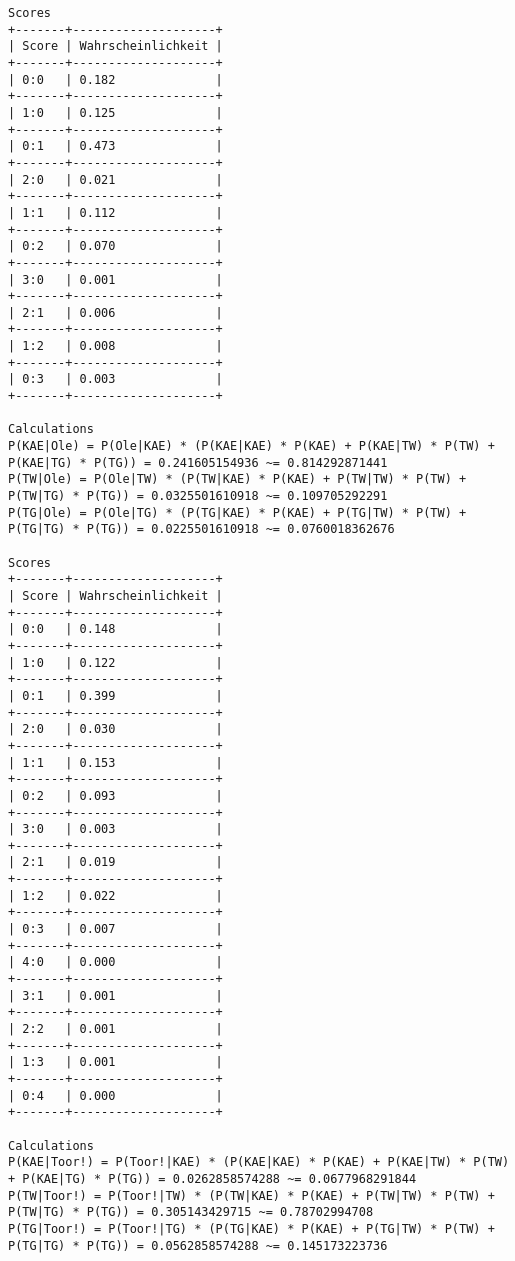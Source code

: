 \documentclass[a4paper]{article}
\begin{document}
\begin{lstlisting}
Scores
+-------+--------------------+
| Score | Wahrscheinlichkeit |
+-------+--------------------+
| 0:0   | 0.182              |
+-------+--------------------+
| 1:0   | 0.125              |
+-------+--------------------+
| 0:1   | 0.473              |
+-------+--------------------+
| 2:0   | 0.021              |
+-------+--------------------+
| 1:1   | 0.112              |
+-------+--------------------+
| 0:2   | 0.070              |
+-------+--------------------+
| 3:0   | 0.001              |
+-------+--------------------+
| 2:1   | 0.006              |
+-------+--------------------+
| 1:2   | 0.008              |
+-------+--------------------+
| 0:3   | 0.003              |
+-------+--------------------+

Calculations
P(KAE|Ole) = P(Ole|KAE) * (P(KAE|KAE) * P(KAE) + P(KAE|TW) * P(TW) + P(KAE|TG) * P(TG)) = 0.241605154936 ~= 0.814292871441
P(TW|Ole) = P(Ole|TW) * (P(TW|KAE) * P(KAE) + P(TW|TW) * P(TW) + P(TW|TG) * P(TG)) = 0.0325501610918 ~= 0.109705292291
P(TG|Ole) = P(Ole|TG) * (P(TG|KAE) * P(KAE) + P(TG|TW) * P(TW) + P(TG|TG) * P(TG)) = 0.0225501610918 ~= 0.0760018362676

Scores
+-------+--------------------+
| Score | Wahrscheinlichkeit |
+-------+--------------------+
| 0:0   | 0.148              |
+-------+--------------------+
| 1:0   | 0.122              |
+-------+--------------------+
| 0:1   | 0.399              |
+-------+--------------------+
| 2:0   | 0.030              |
+-------+--------------------+
| 1:1   | 0.153              |
+-------+--------------------+
| 0:2   | 0.093              |
+-------+--------------------+
| 3:0   | 0.003              |
+-------+--------------------+
| 2:1   | 0.019              |
+-------+--------------------+
| 1:2   | 0.022              |
+-------+--------------------+
| 0:3   | 0.007              |
+-------+--------------------+
| 4:0   | 0.000              |
+-------+--------------------+
| 3:1   | 0.001              |
+-------+--------------------+
| 2:2   | 0.001              |
+-------+--------------------+
| 1:3   | 0.001              |
+-------+--------------------+
| 0:4   | 0.000              |
+-------+--------------------+

Calculations
P(KAE|Toor!) = P(Toor!|KAE) * (P(KAE|KAE) * P(KAE) + P(KAE|TW) * P(TW) + P(KAE|TG) * P(TG)) = 0.0262858574288 ~= 0.0677968291844
P(TW|Toor!) = P(Toor!|TW) * (P(TW|KAE) * P(KAE) + P(TW|TW) * P(TW) + P(TW|TG) * P(TG)) = 0.305143429715 ~= 0.78702994708
P(TG|Toor!) = P(Toor!|TG) * (P(TG|KAE) * P(KAE) + P(TG|TW) * P(TW) + P(TG|TG) * P(TG)) = 0.0562858574288 ~= 0.145173223736


\end{lstlisting}
\end{document}
